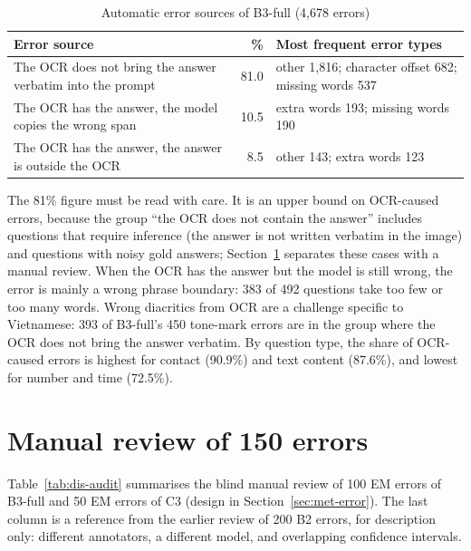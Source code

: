 \begin{table}[htbp]
\caption{Automatic error sources of B3-full (4,678 errors)}
\label{tab:dis-source}
\centering
\small
\begin{tabular}{p{}rp{}}
\toprule
\raggedright \textbf{Error source} & \raggedright \textbf{\%} & \raggedright \textbf{Most frequent error types} \tabularnewline
\midrule
\raggedright The OCR does not bring the answer verbatim into the prompt & \raggedright 81.0 & \raggedright other 1,816; character offset 682; missing words 537 \tabularnewline
\raggedright The OCR has the answer, the model copies the wrong span & \raggedright 10.5 & \raggedright extra words 193; missing words 190 \tabularnewline
\raggedright The OCR has the answer, the answer is outside the OCR & \raggedright 8.5 & \raggedright other 143; extra words 123 \tabularnewline
\bottomrule
\end{tabular}
\end{table}

The 81\% figure must be read with care. It is an upper bound on OCR-caused errors, because
the group ``the OCR does not contain the answer'' includes questions that require inference
(the answer is not written verbatim in the image) and questions with noisy gold answers;
Section~\ref{sec:dis-audit} separates these cases with a manual review. When the OCR has
the answer but the model is still wrong, the error is mainly a wrong phrase boundary: 383
of 492 questions take too few or too many words. Wrong diacritics from OCR are a challenge
specific to Vietnamese: 393 of B3-full's 450 tone-mark errors are in the group where the OCR
does not bring the answer verbatim. By question type, the share of OCR-caused errors is
highest for contact (90.9\%) and text content (87.6\%), and lowest for number and time
(72.5\%).

\section{Manual review of 150 errors}
\label{sec:dis-audit}

Table~\ref{tab:dis-audit} summarises the blind manual review of 100 EM errors of B3-full
and 50 EM errors of C3 (design in Section~\ref{sec:met-error}). The last column is a
reference from the earlier review of 200 B2 errors, for description only: different
annotators, a different model, and overlapping confidence intervals.

